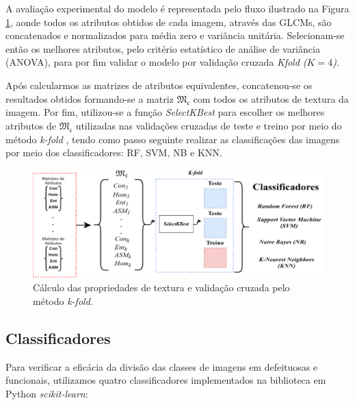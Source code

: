 \documentclass[a4paper]{ifacconf}
\begin{document}
A avaliação experimental do modelo é representada pelo fluxo ilustrado na Figura \ref{fig:Fig05}, aonde todos os atributos obtidos de cada imagem, através das GLCMs, são concatenados e normalizados para média zero e variância unitária. Selecionam-se então os melhores atributos, pelo critério estatístico de análise de variância (ANOVA), para por fim validar o modelo por validação cruzada \textit{Kfold ($K = 4$)}.

Após calcularmos as matrizes de atributos equivalentes, concatenou-se os resultados obtidos formando-se a matriz $\mathfrak{M_c}$ com todos os atributos de textura da imagem. Por fim, utilizou-se a função \textit{SelectKBest} para escolher os melhores atributos de $\mathfrak{M_c}$ utilizadas nas validações cruzadas de teste e treino por meio do método \textit{k-fold} \citep{7544814}, tendo como passo seguinte realizar as classificações das imagens por meio dos classificadores: RF, SVM, NB e KNN.

\begin{figure}[hbt!]
\begin{center}
\includegraphics[width=14cm]{imgs/Fig05.png}    %
\caption{Cálculo das propriedades de textura e validação cruzada pelo método \textit{k-fold.}} 
\label{fig:Fig05}
\end{center}
\end{figure}


\subsection{Classificadores}

Para verificar a eficácia da divisão das classes de imagens em defeituosas e funcionais, utilizamos quatro classificadores implementados na biblioteca em Python \textit{scikit-learn}:


\end{document}

